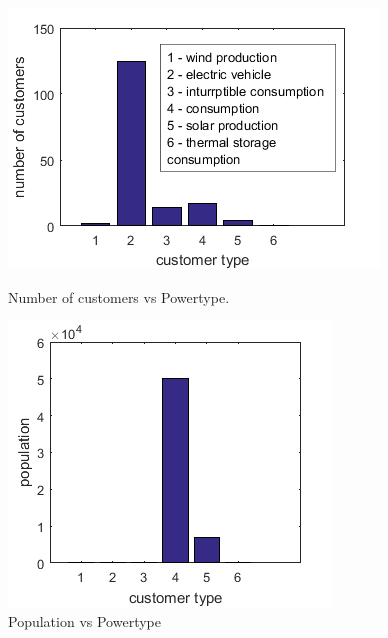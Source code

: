 \begin{itemize}
\begin{figure}
\centering
\begin{minipage}{.5\textwidth}
  \centering
  \includegraphics[width=\linewidth]{4-customer-vs-powertype.jpg}
  \caption{Number of customers vs Powertype.}
  \label{fig:cust-pt}
\end{minipage}%
\begin{minipage}{.5\textwidth}
  \centering
  \includegraphics[width=\linewidth]{2-population-vs-powertype.jpg}
  \caption{Population vs Powertype}
  \label{fig:pop-pt}
\end{minipage}


\end{figure}
\end{itemize}
